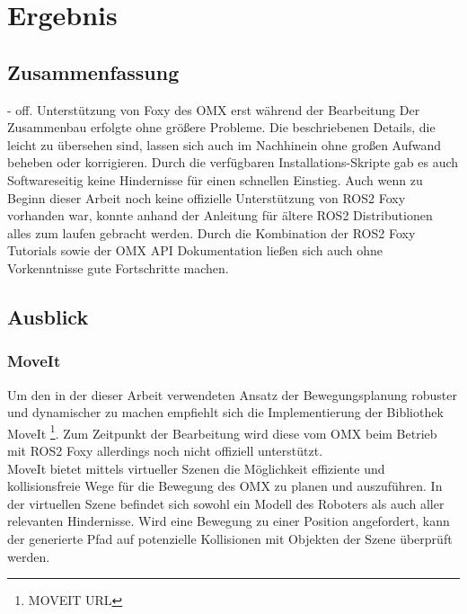 \section{Ergebnis}
\subsection{Zusammenfassung}
- off. Unterstützung von Foxy des OMX erst während der Bearbeitung
Der Zusammenbau erfolgte ohne größere Probleme.
Die beschriebenen Details, die leicht zu übersehen sind, lassen sich auch im Nachhinein ohne großen Aufwand beheben oder korrigieren.
Durch die verfügbaren Installations-Skripte gab es auch Softwareseitig keine Hindernisse für einen schnellen Einstieg.
Auch wenn zu Beginn dieser Arbeit noch keine offizielle Unterstützung von \ac{ROS2} Foxy vorhanden war, konnte anhand der Anleitung für ältere \ac{ROS2} Distributionen alles zum laufen gebracht werden.
Durch die Kombination der \ac{ROS2} Foxy Tutorials sowie der OMX API Dokumentation ließen sich auch ohne Vorkenntnisse gute Fortschritte machen.
\subsection{Ausblick}
\subsubsection{MoveIt}
Um den in der dieser Arbeit verwendeten Ansatz der Bewegungsplanung robuster und dynamischer zu machen empfiehlt sich die Implementierung der Bibliothek MoveIt \footnote{MOVEIT URL}.
Zum Zeitpunkt der Bearbeitung wird diese vom OMX beim Betrieb mit \ac{ROS2} Foxy allerdings noch nicht offiziell unterstützt.\\
MoveIt bietet mittels virtueller Szenen die Möglichkeit effiziente und kollisionsfreie Wege für die Bewegung des OMX zu planen und auszuführen.
In der virtuellen Szene befindet sich sowohl ein Modell des Roboters als auch aller relevanten Hindernisse.
Wird eine Bewegung zu einer Position angefordert, kann der generierte Pfad auf potenzielle Kollisionen mit Objekten der Szene überprüft werden.
